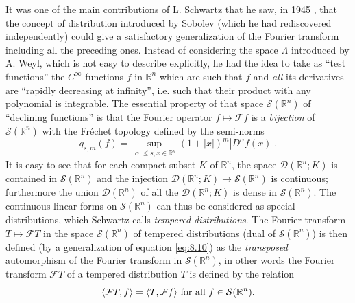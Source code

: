 \documentclass[12pt,a4paper,leqno,twoside]{extbook}
\DeclarePairedDelimiter{\ip}{\langle}{\rangle}
\newcommand{\R}{\mathbb{R}}
\begin{document}
It was one of the main contributions of L. Schwartz that he saw, in 1945 \cite{194}, that the concept of distribution introduced by Sobolev (which he had rediscovered independently) could give a satisfactory generalization of the Fourier transform including all the preceding ones. Instead of considering the space \(\Lambda\) introduced by A. Weyl, which is not easy to describe explicitly, he had the idea to take as ``test functions'' the \(C^\infty\) functions \(f\) in \(\R^n\) which are such that \(f\) and \emph{all} its derivatives are ``rapidly decreasing at infinity'', i.e. such that their product with any polynomial is integrable. The essential property of that space \(\mathcal{S}(\R^n)\) of ``declining functions'' is that the Fourier operator \(f \mapsto \mathcal{F}f\) is a \emph{bijection} of \(\mathcal{S}(\R^n)\) with the Fréchet topology defined by the semi-norms
\begin{equation}
    \label{eq:8.12}
    q_{s,m}(f) = \sup_{|\alpha| \leq s, x \in \R^n} (1+|x|)^m |D^\alpha f(x)|.
\end{equation}
It is easy to see that for each compact subset \(K\) of \(\R^n\), the space \(\mathcal{D}(\R^n; K)\) is contained in \(\mathcal{S}(\R^n)\) and the injection \(\mathcal{D}(\R^n; K) \to \mathcal{S}(\R^n)\) is continuous; furthermore the union \(\mathcal{D}(\R^n)\) of all the \(\mathcal{D}(\R^n; K)\) is dense in \(\mathcal{S}(\R^n)\). The continuous linear forms on \(\mathcal{S}(\R^n)\) can thus be considered as special distributions, which Schwartz calls \emph{tempered distributions}. The Fourier transform \(T \mapsto \mathcal{F}T\) in the space \(\mathcal{S}(\R^n)\) of tempered distributions (dual of \(\mathcal{S}(\R^n)\)) is then defined (by a generalization of equation \eqref{eq:8.10}) as the \emph{transposed} automorphism of the Fourier transform in \(\mathcal{S}(\R^n)\), in other words the Fourier transform \(\mathcal{F}T\) of a tempered distribution \(T\) is defined by the relation
\begin{equation}
    \label{eq:8.13}
    \ip{\mathcal{F}T, f} = \ip{T, \mathcal{F}f}
    \text{ for all }
    f \in \mathcal{S}(\R^n).
\end{equation}
\end{document}
